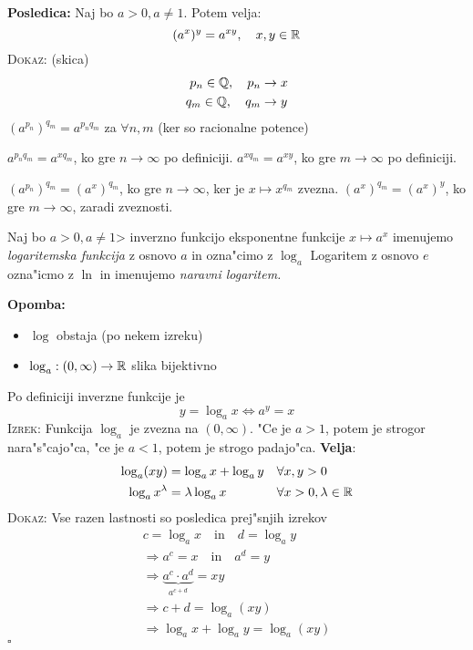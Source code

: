 \textbf{Posledica:} Naj bo $a > 0, a \neq 1$. Potem velja:
\begin{equation*}
(a^x)^y = a^{xy}, \quad x, y \in \mathbb{R}
\end{equation*}
\textsc{Dokaz:} (skica)
\begin{align*}
p_n \in \mathbb{Q}, \quad p_n &\to x \\
q_m \in \mathbb{Q}, \quad q_m &\to y
\end{align*}
$(a^{p_n})^{q_m} = a^{p_n q_m}$ za $\forall n, m$ (ker so racionalne potence)

$a^{p_n q_m} = a^{x q_m}$, ko gre $n \to \infty$ po definiciji. $a^{x q_m} = a^{xy}$, ko gre $m \to \infty$ po definiciji.

$(a^{p_n})^{q_m} = (a^x)^{q_m}$, ko gre $n \to \infty$, ker je $x \mapsto x^{q_m}$ zvezna. $(a^x)^{q_m} = (a^x)^y$, ko gre $m \to \infty$, zaradi zveznosti.

 Naj bo $a > 0, a \neq 1$> inverzno funkcijo eksponentne funkcije $x \mapsto a^x$ imenujemo \emph{logaritemska funkcija} z osnovo $a$ in ozna"cimo z $\log_a$ Logaritem z osnovo $e$ ozna"icmo z $\ln$ in imenujemo \emph{naravni logaritem.}

\textbf{Opomba:}
\begin{itemize}
	\item $\log$ obstaja (po nekem izreku)
	\item $\log_a: (0, \infty) \to \mathbb{R}$ slika bijektivno
\end{itemize}
Po definiciji inverzne funkcije je
\begin{equation*}
y = \log_a x \iff a^y = x
\end{equation*}
\textsc{Izrek:} Funkcija $\log_a$ je zvezna na $(0, \infty)$. "Ce je $a > 1$, potem je strogor nara"s"cajo"ca, "ce je $a < 1$, potem je strogo padajo"ca. \textbf{Velja}:
\begin{align*}
\log_a(xy) &= \log_a x + \log_a y &&\forall x, y > 0 \\
\log_a x^\lambda &= \lambda \log_a x &&\forall x > 0, \lambda \in \mathbb{R}
\end{align*}
\textsc{Dokaz:} Vse razen lastnosti so posledica prej"snjih izrekov
\begin{gather*}
c = \log_a x \quad \text{in} \quad d = \log_a y \\
\Rightarrow a^c = x \quad \text{in} \quad a^d = y \\
\Rightarrow \underbrace{a^c \cdot a^d}_{a^{c + d}} = xy \\
\Rightarrow c + d = \log_a (x y) \\
\Rightarrow \log_a x + \log_a y = \log_a (xy)
\end{gather*}
\hfill $\square$
%
